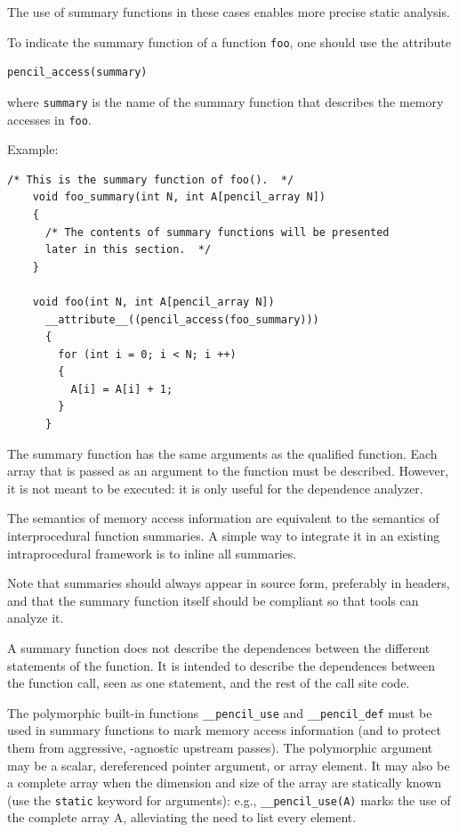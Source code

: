   The use of summary functions in these cases enables more
  precise static analysis.

  To indicate the summary function of a function \lstinline!foo!,
  one should use the attribute
  
  \begin{lstlisting}[language=pencil]
    pencil_access(summary) 
  \end{lstlisting}

  where
  \lstinline!summary! is the name of the summary function  that describes
  the memory accesses in \lstinline!foo!.
  
  Example:
  \begin{lstlisting}[language=pencil]
    /* This is the summary function of foo().  */
    void foo_summary(int N, int A[pencil_array N])
    {
      /* The contents of summary functions will be presented
      later in this section.  */
    }

    void foo(int N, int A[pencil_array N])
      __attribute__((pencil_access(foo_summary)))
      {
        for (int i = 0; i < N; i ++)
        {
          A[i] = A[i] + 1;
        }
      }
  \end{lstlisting}
  
  The summary function has the same arguments as the
  qualified function.  Each array that is passed as an argument to the
  function must be described.
  However, it is not meant to be executed: it is only
  useful for the dependence analyzer.
  
  The semantics of
  memory access information are equivalent to the semantics
  of interprocedural function summaries.  A simple way to integrate
  it in an existing intraprocedural framework is to inline all
  summaries.

  Note that summaries should always appear in source form,
  preferably in headers, and that the summary function itself
  should be \pencil compliant so that \pencil tools can
  analyze it.
  
  A summary function does not describe the dependences between the
  different statements of the function.  It is intended to describe
  the dependences between the function call, seen as one statement,
  and the rest of the call site code.

  The polymorphic built-in functions \lstinline!__pencil_use!
  and \lstinline!__pencil_def! must be used in summary
  functions to mark memory access information (and to protect them
  from aggressive, \pencil-agnostic upstream passes). The
  polymorphic argument may be a scalar,
  dereferenced pointer argument, or array element. It may also be a
  complete array when the dimension and size of the array are
  statically known (use the \lstinline!static! keyword for
  arguments): e.g., \lstinline!__pencil_use(A)! marks the use of the
  complete array A, alleviating the need to list every
  element.

